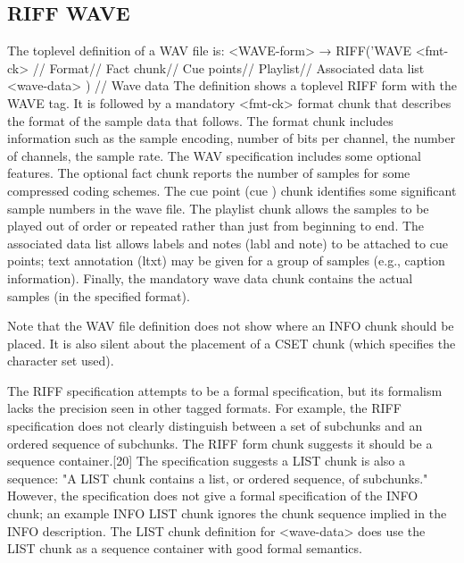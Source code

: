 \documentclass[12pt, a4paper]{article}
\begin{document}
\subsection{RIFF WAVE}
The toplevel definition of a WAV file is:
\newline
<WAVE-form> → RIFF('WAVE\newline
                   <fmt-ck>            // Format\newline
                   [<fact-ck>]         // Fact chunk\newline
                   [<cue-ck>]          // Cue points\newline
                   [<playlist-ck>]     // Playlist // Associated data list\newline
                   <wave-data> )       // Wave data\newline
The definition shows a toplevel RIFF form with the WAVE tag. It is followed by a mandatory <fmt-ck> format chunk that describes the format of the sample data that follows. The format chunk includes information such as the sample encoding, number of bits per channel, the number of channels, the sample rate. The WAV specification includes some optional features. The optional fact chunk reports the number of samples for some compressed coding schemes. The cue point (cue ) chunk identifies some significant sample numbers in the wave file. The playlist chunk allows the samples to be played out of order or repeated rather than just from beginning to end. The associated data list allows labels and notes (labl and note) to be attached to cue points; text annotation (ltxt) may be given for a group of samples (e.g., caption information). Finally, the mandatory wave data chunk contains the actual samples (in the specified format).

Note that the WAV file definition does not show where an INFO chunk should be placed. It is also silent about the placement of a CSET chunk (which specifies the character set used).

The RIFF specification attempts to be a formal specification, but its formalism lacks the precision seen in other tagged formats. For example, the RIFF specification does not clearly distinguish between a set of subchunks and an ordered sequence of subchunks. The RIFF form chunk suggests it should be a sequence container.[20] The specification suggests a LIST chunk is also a sequence: "A LIST chunk contains a list, or ordered sequence, of subchunks." However, the specification does not give a formal specification of the INFO chunk; an example INFO LIST chunk ignores the chunk sequence implied in the INFO description. The LIST chunk definition for <wave-data> does use the LIST chunk as a sequence container with good formal semantics.
\end{document}
